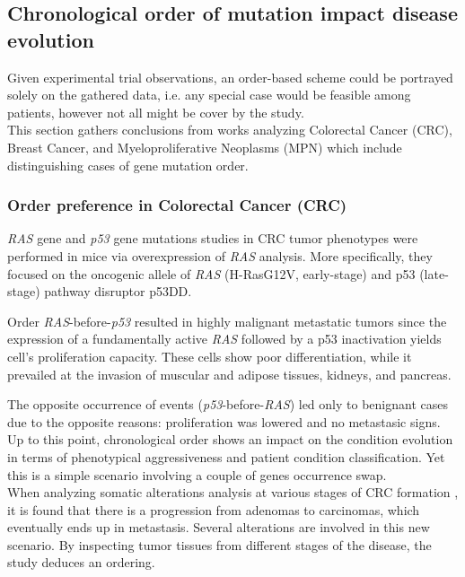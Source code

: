 \subsection{Chronological order of mutation impact disease evolution}
Given experimental trial observations, an order-based scheme could be portrayed solely on the gathered data, i.e. any special case would be feasible among patients, however not all might be cover by the study.
\\

This section gathers conclusions from works analyzing Colorectal Cancer (CRC), Breast Cancer, and Myeloproliferative Neoplasms (MPN) which include distinguishing cases of gene mutation order.

\subsubsection{Order preference in Colorectal Cancer (CRC)}
\label{gene-crc}
\textit{RAS} gene and \textit{p53} gene mutations studies in CRC tumor phenotypes \cite{Gerstung2011TheTumorigenesis} were performed in mice via overexpression of \textit{RAS} analysis. More specifically, they focused on the oncogenic allele of \textit{RAS} (H-RasG12V, early-stage) and p53 (late-stage) pathway disruptor p53DD.

Order \textit{RAS}-before-\textit{p53} resulted in highly malignant metastatic tumors since the expression of a fundamentally active \textit{RAS} followed by a p53 inactivation yields cell's proliferation capacity. These cells show poor differentiation, while it prevailed at the invasion of muscular and adipose tissues, kidneys, and pancreas.

The opposite occurrence of events (\textit{p53}-before-\textit{RAS}) led only to benignant cases due to the opposite reasons: proliferation was lowered and no metastasic signs.
\\

Up to this point, chronological order shows an impact on the condition evolution in terms of phenotypical aggressiveness and patient condition classification. Yet this is a simple scenario involving a couple of genes occurrence swap.
\\

When analyzing somatic alterations analysis at various stages of CRC formation \cite{Fearon1990ATumorigenesis}, it is found that there is a progression from adenomas to carcinomas, which eventually ends up in metastasis. Several alterations are involved in this new scenario. By inspecting tumor tissues from different stages of the disease, the study deduces an ordering.
\\

